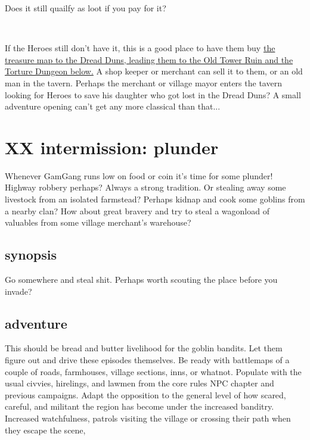 Does it still quailfy as loot if you pay for it?

\

\noindent If the Heroes still don't have it, this is a good place to have them buy 
\hyperref[xxtorturedungeon]{the treasure map to the Dread Duns, leading them to the Old Tower Ruin and the Torture Dungeon below.} 
A shop keeper or merchant can sell it to them, or an old man in the tavern.  Perhaps the merchant or village mayor enters the tavern looking for Heroes to save his daughter who got lost in the Dread Duns? A small adventure opening can't get any more classical than that...













\clearpage
\section*{XX intermission: plunder}

Whenever GamGang runs low on food or coin it's time for some plunder! Highway robbery perhaps? Always a strong tradition. Or stealing away some livestock from an isolated farmstead? Perhaps kidnap and cook some goblins from a nearby clan? How about great bravery and try to steal a wagonload of valuables from some village merchant's warehouse?


\subsection*{synopsis}

Go somewhere and steal shit. Perhaps worth scouting the place before you invade?


\subsection*{adventure}

This should be bread and butter livelihood for the goblin bandits. Let them figure out and drive these episodes themselves. Be ready with battlemaps of a couple of roads, farmhouses, village sections, inns, or whatnot. Populate with the usual civvies, hirelings, and lawmen from the core rules NPC chapter and previous campaigns.
Adapt the opposition to the general level of how scared, careful, and militant the region has become under the increased banditry. Increased watchfulness, patrols visiting the village or crossing their path when they escape the scene, 


